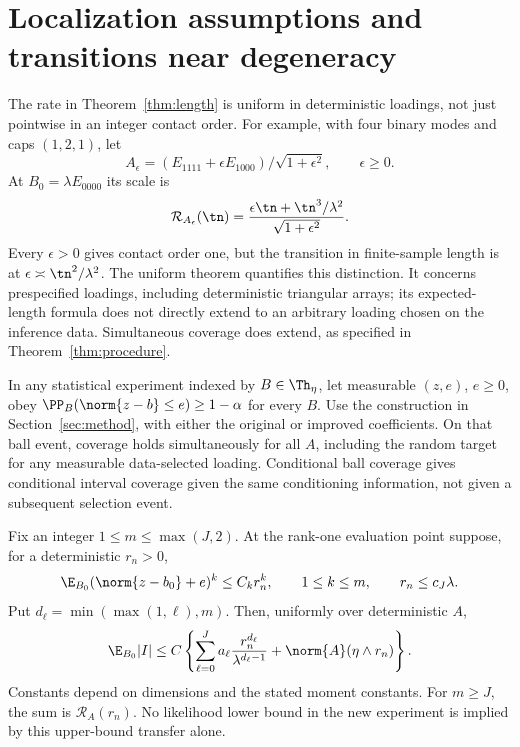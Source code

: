 \section{Localization assumptions and transitions near degeneracy}\label{sec:extensions}
The rate in Theorem~\ref{thm:length} is uniform in deterministic loadings, not just pointwise in an integer contact order. For example, with four binary modes and caps $(1,2,1)$, let
\[
 A_\epsilon=(E_{1111}+\epsilon E_{1000})/\sqrt{1+\epsilon^2},\qquad \epsilon\ge0.
\]
At $B_0=\lambda E_{0000}$ its scale is
\[
 \mathcal R_{A_\epsilon}(\tn)
 =\frac{\epsilon\tn+\tn^3/\lambda^2}{\sqrt{1+\epsilon^2}}.
\]
Every $\epsilon>0$ gives contact order one, but the transition in finite-sample length is at $\epsilon\asymp\tn^2/\lambda^2$. The uniform theorem quantifies this distinction. It concerns prespecified loadings, including deterministic triangular arrays; its expected-length formula does not directly extend to an arbitrary loading chosen on the inference data. Simultaneous coverage does extend, as specified in Theorem~\ref{thm:procedure}.

\begin{theorem}\label{thm:transfer}
In any statistical experiment indexed by $B\in\Th_\eta$, let measurable $(z,e)$, $e\ge0$, obey $\PP_B(\norm{z-b}\le e)\ge1-\alpha$ for every $B$. Use the construction in Section~\ref{sec:method}, with either the original or improved coefficients. On that ball event, coverage holds simultaneously for all $A$, including the random target for any measurable data-selected loading. Conditional ball coverage gives conditional interval coverage given the same conditioning information, not given a subsequent selection event.

Fix an integer $1\le m\le\max(J,2)$. At the rank-one evaluation point suppose, for a deterministic $r_n>0$,
\[
 \E_{B_0}(\norm{z-b_0}+e)^k\le C_k r_n^k,
 \qquad 1\le k\le m,\qquad r_n\le c_J\lambda.
\]
Put $d_\ell=\min(\max(1,\ell),m)$. Then, uniformly over deterministic $A$,
\[
 \E_{B_0}|I|\le C\left\{\sum_{\ell=0}^J
 a_\ell\frac{r_n^{d_\ell}}{\lambda^{d_\ell-1}}
       +\norm{A}(\eta\wedge r_n)\right\}.
\]
Constants depend on dimensions and the stated moment constants. For $m\ge J$, the sum is $\mathcal R_A(r_n)$. No likelihood lower bound in the new experiment is implied by this upper-bound transfer alone.
\end{theorem}

